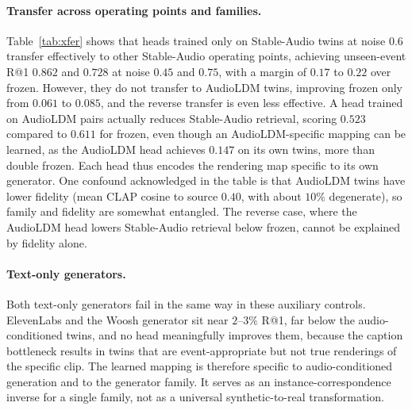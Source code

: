 \documentclass{article}
\begin{document}
\paragraph{Transfer across operating points and families.} Table~\ref{tab:xfer} shows that heads trained only on Stable-Audio twins at noise $0.6$ transfer effectively to other Stable-Audio operating points, achieving unseen-event R@1 $0.862$ and $0.728$ at noise $0.45$ and $0.75$, with a margin of $0.17$ to $0.22$ over frozen. However, they do not transfer to AudioLDM twins, improving frozen only from $0.061$ to $0.085$, and the reverse transfer is even less effective. A head trained on AudioLDM pairs actually reduces Stable-Audio retrieval, scoring $0.523$ compared to $0.611$ for frozen, even though an AudioLDM-specific mapping can be learned, as the AudioLDM head achieves $0.147$ on its own twins, more than double frozen. Each head thus encodes the rendering map specific to its own generator. One confound acknowledged in the table is that AudioLDM twins have lower fidelity (mean CLAP cosine to source $0.40$, with about $10\%$ degenerate), so family and fidelity are somewhat entangled. The reverse case, where the AudioLDM head lowers Stable-Audio retrieval below frozen, cannot be explained by fidelity alone.

\paragraph{Text-only generators.} Both text-only generators fail in the same way in these auxiliary controls. ElevenLabs and the Woosh generator sit near $2$--$3\%$ R@1, far below the audio-conditioned twins, and no head meaningfully improves them, because the caption bottleneck results in twins that are event-appropriate but not true renderings of the specific clip. The learned mapping is therefore specific to audio-conditioned generation and to the generator family. It serves as an instance-correspondence inverse for a single family, not as a universal synthetic-to-real transformation.
\end{document}

